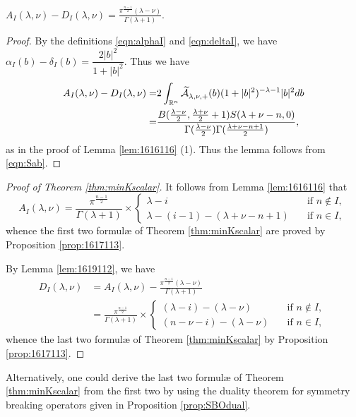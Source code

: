 \begin{lemma}
\label{lem:1619112}
$A_I(\lambda,\nu)-D_I(\lambda,\nu)=\frac{\pi^{\frac {n-1}2}(\lambda-\nu)}{\Gamma(\lambda+1)}$.  
\end{lemma}
\begin{proof}
By the definitions \eqref{eqn:alphaI} and \eqref{eqn:deltaI}, 
 we have $\alpha_I(b) - \delta_I(b)=\dfrac{2|b|^2}{1+|b|^2}$.  
Thus we have
\begin{align*}
   A_I(\lambda,\nu)-D_I(\lambda,\nu)
   =&
   2 \int_{{\mathbb{R}}^{n}}
   \widetilde{{\mathcal{A}}}_{{\lambda},{\nu},{+}}^{{}}(b)
   (1+|b|^2)^{-\lambda-1}|b|^2 d b
\\
   =& \frac{B(\frac{\lambda-\nu}2,\frac{\lambda+\nu}2+1)
             S(\lambda+\nu-n,0)}
           {\Gamma(\frac{\lambda-\nu}{2})\Gamma(\frac{\lambda+\nu-n+1}{2})}, 
\end{align*}
as in the proof of Lemma \ref{lem:1616116} (1).  
Thus the lemma follows from \eqref{eqn:Sab}.  
\end{proof}

\begin{proof}
[Proof of Theorem \ref{thm:minKscalar}]
It follows from Lemma \ref{lem:1616116} that 
\[
  A_I(\lambda,\nu)
  =
  \frac{\pi^{\frac{n-1}{2}}}{\Gamma(\lambda+1)}
  \times 
\begin{cases}
\lambda-i
&
\text{if $n \not\in I$, }
\\
\lambda-(i-1)-(\lambda+\nu-n+1)
\quad
&
\text{if $n \in I$, }
\end{cases}
\]
whence the first two formul{\ae} of Theorem \ref{thm:minKscalar}
 are proved 
 by Proposition \ref{prop:1617113}.  

By Lemma \ref{lem:1619112}, 
 we have 
\begin{align*}
  D_I(\lambda,\nu)
  &=
  A_I(\lambda,\nu)
  -
  \frac{\pi^{\frac{n-1}{2}}(\lambda-\nu)}{\Gamma(\lambda+1)}
\\
  &=
  \frac{\pi^{\frac{n-1}{2}}}{\Gamma(\lambda+1)}
  \times
\begin{cases}
(\lambda-i)-(\lambda-\nu)
&
\text{if $n \not\in I$, }
\\
(n-\nu-i)-(\lambda-\nu)
\quad
&
\text{if $n \in I$, }
\end{cases}
\end{align*}
whence the last two formul{\ae}
 of Theorem \ref{thm:minKscalar}
 by Proposition \ref{prop:1617113}.  
\end{proof}

\begin{remark}
\label{rem:KKdual}
Alternatively,
 one could derive the last two formul{\ae}
 of Theorem \ref{thm:minKscalar} from the first two
 by using the duality theorem for symmetry breaking operators
 given in Proposition \ref{prop:SBOdual}.  
\end{remark}

